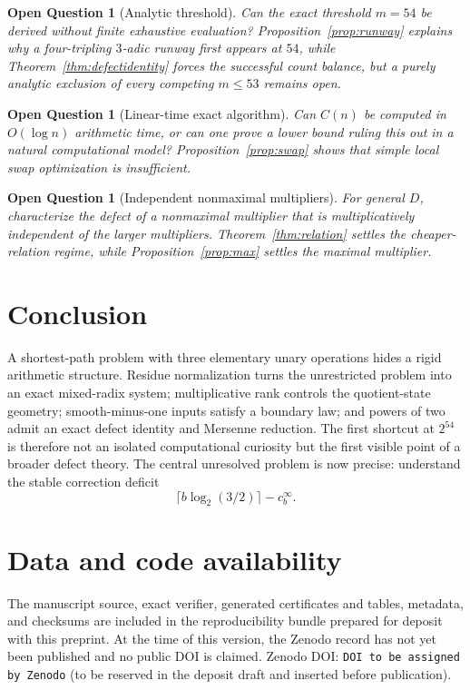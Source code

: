 \documentclass[11pt]{article}
\newtheorem{question}[theorem]{Open Question}
\newcommand{\ZenodoDOI}{DOI to be assigned by Zenodo}
\begin{document}
\begin{question}[Analytic threshold]
Can the exact threshold $m=54$ be derived without finite exhaustive evaluation? Proposition~\ref{prop:runway} explains why a four-tripling $3$-adic runway first appears at $54$, while Theorem~\ref{thm:defectidentity} forces the successful count balance, but a purely analytic exclusion of every competing $m\le53$ remains open.
\end{question}

\begin{question}[Linear-time exact algorithm]
Can $C(n)$ be computed in $O(\log n)$ arithmetic time, or can one prove a lower bound ruling this out in a natural computational model? Proposition~\ref{prop:swap} shows that simple local swap optimization is insufficient.
\end{question}

\begin{question}[Independent nonmaximal multipliers]
For general $D$, characterize the defect of a nonmaximal multiplier that is multiplicatively independent of the larger multipliers. Theorem~\ref{thm:relation} settles the cheaper-relation regime, while Proposition~\ref{prop:max} settles the maximal multiplier.
\end{question}

\section{Conclusion}
A shortest-path problem with three elementary unary operations hides a rigid arithmetic structure. Residue normalization turns the unrestricted problem into an exact mixed-radix system; multiplicative rank controls the quotient-state geometry; smooth-minus-one inputs satisfy a boundary law; and powers of two admit an exact defect identity and Mersenne reduction. The first shortcut at $2^{54}$ is therefore not an isolated computational curiosity but the first visible point of a broader defect theory. The central unresolved problem is now precise: understand the stable correction deficit
\[
 \lceil b\log_2(3/2)\rceil-c_b^\infty.
\]

\section*{Data and code availability}
The manuscript source, exact verifier, generated certificates and tables, metadata, and checksums are included in the reproducibility bundle prepared for deposit with this preprint. At the time of this version, the Zenodo record has not yet been published and no public DOI is claimed. Zenodo DOI: \texttt{\ZenodoDOI} (to be reserved in the deposit draft and inserted before publication).
\end{document}
